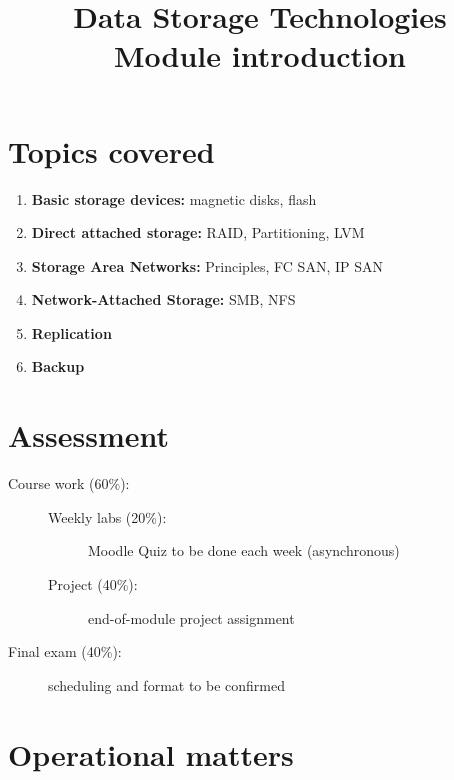 \documentclass[slides]{pgnotes}
\title{Data Storage Technologies\\Module introduction}
\begin{document}
\maketitle

\section{Topics covered}

\begin{enumerate}

\item \textbf{Basic storage devices:} magnetic disks, flash

\item \textbf{Direct attached storage:} RAID, Partitioning, LVM

\item \textbf{Storage Area Networks:} Principles, FC SAN, IP SAN

\item \textbf{Network-Attached Storage:} SMB, NFS

\item \textbf{Replication}

\item \textbf{Backup}
  
\end{enumerate}


\section{Assessment}

\begin{description}
\item[Course work (60\%):]
  \begin{description}
  \item[Weekly labs (20\%):] Moodle Quiz to be done each week (asynchronous)
  \item[Project (40\%):] end-of-module project assignment
  \end{description}
\item[Final exam (40\%):] scheduling and format to be confirmed
\end{description}


\section{Operational matters}
\end{document}
